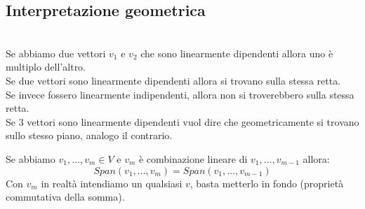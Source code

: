 \documentclass[12pt,a4paper]{article}
\begin{document}
\subsection{Interpretazione geometrica}
\\
Se abbiamo due vettori $v_1$ e $v_2$ che sono linearmente dipendenti allora uno è multiplo dell'altro.\\
Se due vettori sono linearmente dipendenti allora si trovano sulla stessa retta.\\
Se invece fossero linearmente indipendenti, allora non si troverebbero sulla stessa retta.\\
Se 3 vettori sono linearmente dipendenti vuol dire che geometricamente si trovano sullo stesso piano, analogo il contrario.\\
Se abbiamo $v_1,\ldots,v_m \in V$ e $v_m$ è combinazione lineare di $v_1, \ldots, v_{m-1}$ allora:
\[
Span(v_1,\ldots,v_m) = Span(v_1,\ldots,v_{m-1})
\] 
Con $v_m$ in realtà intendiamo un qualsiasi $v$, basta metterlo in fondo (proprietà commutativa della somma).
\end{document}
